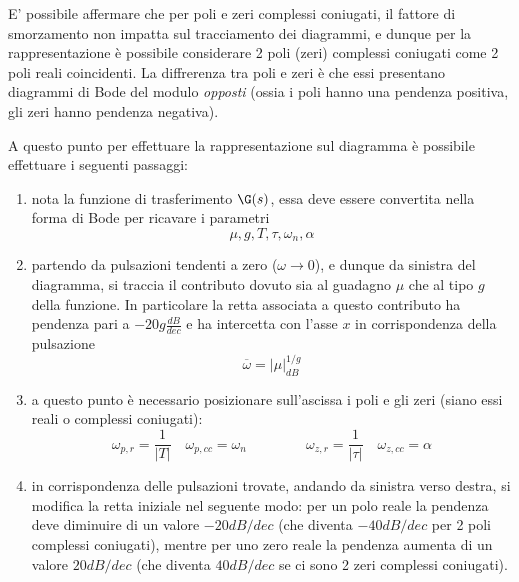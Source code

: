 			E' possibile affermare che per poli e zeri complessi coniugati, il fattore di smorzamento non impatta sul tracciamento dei diagrammi, e dunque per la rappresentazione è possibile considerare 2 poli (zeri) complessi coniugati come 2 poli reali coincidenti. La diffrerenza tra poli e zeri è che essi presentano diagrammi di Bode del modulo \textit{opposti} (ossia i poli hanno una pendenza positiva, gli zeri hanno pendenza negativa).
			
			A questo punto per effettuare la rappresentazione sul diagramma è possibile effettuare i seguenti passaggi:
			\begin{enumerate}
				\item nota la funzione di trasferimento $\G(s)$, essa deve essere convertita nella forma di Bode per ricavare i parametri
				\[ \mu, g, T, \tau, \omega_n, \alpha \]
				
				\item partendo da pulsazioni tendenti a zero ($\omega \rightarrow 0$), e dunque da sinistra del diagramma, si traccia il contributo dovuto sia al guadagno $\mu$ che al tipo $g$ della funzione. In particolare la retta associata a questo contributo ha pendenza pari a  $-20 g \frac{dB}{dec}$ e ha intercetta con l'asse $x$ in corrispondenza della pulsazione 
				\[\overline \omega  = |\mu|^{1/g}_{dB}\]
				
				\item a questo punto è necessario posizionare sull'ascissa i poli e gli zeri (siano essi reali o complessi coniugati):
				\[ \omega_{p,r} = \frac 1{|T|} \quad \omega_{p,cc} = \omega_n \qquad \ \qquad \omega_{z,r} = \frac 1 {|\tau|} \quad \omega_{z,cc} = \alpha \]
				
				\item in corrispondenza delle pulsazioni trovate, andando da sinistra verso destra, si modifica la retta iniziale nel seguente modo: per un polo reale la pendenza deve diminuire di un valore $-20dB/dec$ (che diventa $-40dB/dec$ per 2 poli complessi coniugati), mentre per uno zero reale la pendenza aumenta di un valore $20dB/dec$ (che diventa $40dB/dec$ se ci sono 2 zeri complessi coniugati).
				
			\end{enumerate}
		
